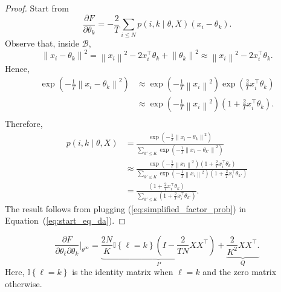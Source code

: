 \begin{proof}
Start from
%
\begin{equation}
\frac{\partial F}{\partial \theta_k} = - \frac{2}{T} \sum_{i \leq N} p\left(i,k \mid \theta, X\right)(x_i - \theta_k).
\label{eq:start_eq_da}
\end{equation}
%
Observe that, inside $\mathcal{B}$,
%
\begin{equation}
\left\|x_i - \theta_k\right\|^2 = \left\|x_i\right\|^2 - 2x_i^\top\theta_k + \left\|\theta_k\right\|^2 \approx \left\|x_i\right\|^2 - 2x_i^\top \theta_k.
\end{equation}
%
Hence,
%
\begin{align}
\exp\left(- \frac{1}{T}\left\|x_i - \theta_k\right\|^2\right) &\approx \exp\left(-\frac{1}{T}\left\|x_i\right\|^2\right)\exp\left(\frac{2}{T}x_i^\top \theta_k\right)\\
&\approx \exp\left(-\frac{1}{T}\left\|x_i\right\|^2\right)\left(1 + \frac{2}{T}x_i^\top \theta_k\right).\\
\end{align}
%
Therefore,
%
\begin{align}
p\left(i,k \mid \theta, X\right) &= \frac{\exp\left(-\frac{1}{T}\left\|x_i - \theta_k\right\|^2\right)}{\sum_{k' \leq K}\exp\left(-\frac{1}{T}\left\|x_i - \theta_{k'}\right\|^2\right)}\\
&\approx \frac{\exp\left(-\frac{1}{T}\left\|x_i\right\|^2\right)\left(1 + \frac{2}{T}x_i^\top \theta_k\right)}{\sum_{k' \leq K}\exp\left(-\frac{1}{T}\left\|x_i\right\|^2\right)\left(1 + \frac{2}{T}x_i^\top \theta_{k'}\right)}\\
&= \frac{\left(1 + \frac{2}{T}x_i^\top \theta_{k}\right)}{\sum_{k' \leq K}\left(1 + \frac{2}{T}x_i^\top \theta_{k'}\right)}.\label{eq:simplified_factor_prob}
\end{align}
%
The result follows from plugging (\ref{eq:simplified_factor_prob}) in Equation~(\ref{eq:start_eq_da}).
\end{proof}

\begin{lemma}
\begin{equation}
\frac{\partial F}{\partial \theta_\ell \partial \theta_k}\Bigr|_{\theta^\infty} = \underbrace{\frac{2N}{K}\mathbb{I}\left\{\ell = k\right\}\left(I - \frac{2}{TN}XX^\top\right)}_{P} + \underbrace{\frac{2}{K^2}XX^\top.}_Q
\end{equation}
Here, $\mathbb{I}\left\{\ell = k\right\}$ is the identity matrix when $\ell = k$ and the zero matrix otherwise.
\end{lemma}

